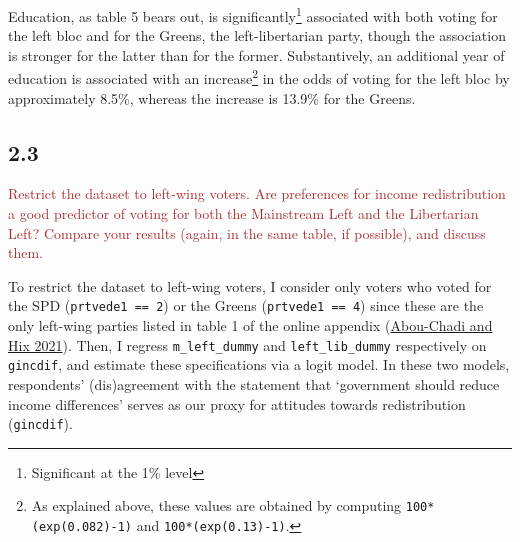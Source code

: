 \documentclass[
]{article}
\begin{document}
Education, as table 5 bears out, is significantly\footnote{Significant
  at the 1\% level} associated with both voting for the left bloc and
for the Greens, the left-libertarian party, though the association is
stronger for the latter than for the former. Substantively, an
additional year of education is associated with an increase\footnote{As
  explained above, these values are obtained by computing
  \texttt{100*(exp(0.082)-1)} and \texttt{100*(exp(0.13)-1)}.} in the
odds of voting for the left bloc by approximately 8.5\%, whereas the
increase is 13.9\% for the Greens.

\hypertarget{section-4}{%
\subsection{2.3}\label{section-4}}

\textcolor{brown}{Restrict the dataset to left-wing voters. Are preferences for income redistribution a good predictor of voting for both the Mainstream Left and the Libertarian Left? Compare your results (again, in the same table, if possible), and discuss them.}

To restrict the dataset to left-wing voters, I consider only voters who
voted for the SPD (\texttt{prtvede1\ ==\ 2}) or the Greens
(\texttt{prtvede1\ ==\ 4}) since these are the only left-wing parties
listed in table 1 of the online appendix
(\protect\hyperlink{ref-abou-chadi_brahmin_2021}{Abou-Chadi and Hix
2021}). Then, I regress \texttt{m\_left\_dummy} and
\texttt{left\_lib\_dummy} respectively on \texttt{gincdif}, and estimate
these specifications via a logit model. In these two models,
respondents' (dis)agreement with the statement that `government should
reduce income differences' serves as our proxy for attitudes towards
redistribution (\texttt{gincdif}).
\end{document}
